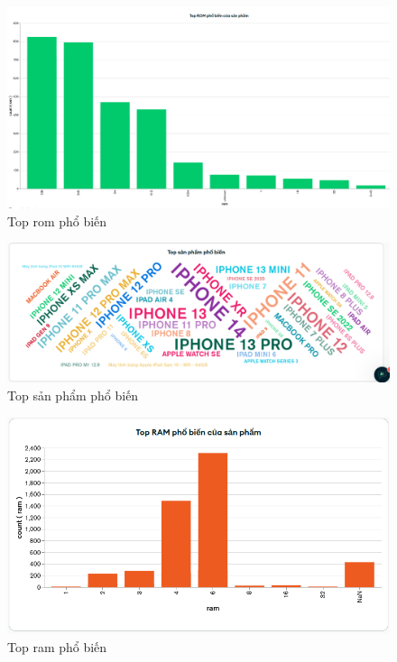 \documentclass[../DoAn.tex]{subfiles}
\begin{document}
\begin{figure}[H]
    \centering
    \includegraphics[scale=0.25]{Hinhve/topRom.png}
    \caption{Top rom phổ biến}
    \label{fig:my_label2}
\end{figure}

\begin{figure}[H]
    \centering
    \includegraphics[scale=0.4]{Hinhve/topProduct.png}
    \caption{Top sản phẩm phổ biến}
    \label{fig:my_label2}
\end{figure}

\begin{figure}[H]
    \centering
    \includegraphics[scale=0.55]{Hinhve/topRam.png}
    \caption{Top ram phổ biến}
    \label{fig:my_label2}
\end{figure}
\end{document}
